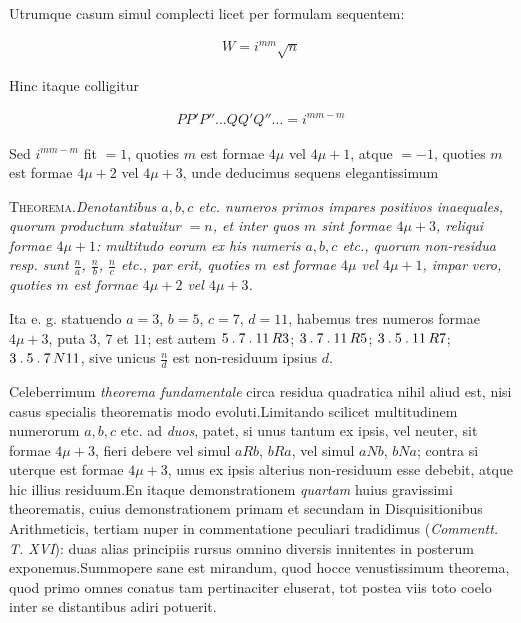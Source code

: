 Utrumque casum simul complecti licet per formulam sequentem:

\[
\begin{aligned}
W=i^{mm}\surd n
\end{aligned}
\]

Hinc itaque colligitur

\[
\begin{aligned}
PP'P''\ldots QQ'Q''\ldots=i^{mm-m}
\end{aligned}
\]

Sed $i^{mm-m}$ fit $=1$, quoties $m$ est formae $4\mu$ vel $4\mu+1$, atque $=-1$, quoties $m$ est formae $4\mu+2$ vel $4\mu+3$, unde deducimus sequens elegantissimum

\textsc{Theorema.}\quad \textit{Denotantibus $a,b,c$ etc. numeros primos impares positivos inae}\textit{quales, quorum productum statuitur $=n$, et inter quos $m$ sint formae $4\mu+3$, re}\textit{liqui formae $4\mu+1$: multitudo eorum ex his numeris $a,b,c$ etc., quorum non-resi}\textit{dua resp. sunt $\frac{n}{a}$, $\frac{n}{b}$, $\frac{n}{c}$ etc., par erit, quoties $m$ est formae $4\mu$ vel $4\mu+1$, impar} \textit{vero, quoties $m$ est formae $4\mu+2$ vel $4\mu+3$.}

Ita e. g. statuendo $a=3$, $b=5$, $c=7$, $d=11$, habemus tres numeros formae $4\mu+3$, puta $3$, $7$ et $11$; est autem $5\mathbin{.}7\mathbin{.}11\,R3$; $3\mathbin{.}7\mathbin{.}11\,R5$; $3\mathbin{.}5\mathbin{.}11\,R7$; $3\mathbin{.}5\mathbin{.}7\,N11$, sive unicus $\frac{n}{d}$ est non-residuum ipsius $d$.


Celeberrimum \textit{theorema fundamentale} circa residua quadratica nihil aliud est, nisi casus specialis theorematis modo evoluti.\quad Limitando scilicet multitudinem
%
numerorum $a,b,c$ etc. ad \textit{duos}, patet, si unus tantum ex ipsis, vel neuter, sit formae $4\mu+3$, fieri debere vel simul $aRb$, $bRa$, vel simul $aNb$, $bNa$; contra si uterque est formae $4\mu+3$, unus ex ipsis alterius non-residuum esse debebit, atque hic illius residuum.\quad En itaque demonstrationem \textit{quartam} huius gravissimi theorematis, cuius demonstrationem primam et secundam in Disquisitionibus Arithmeticis, tertiam nuper in commentatione peculiari tradidimus (\textit{Commentt. T. XVI}): duas alias principiis rursus omnino diversis innitentes in posterum exponemus.\quad Summopere sane est mirandum, quod hocce venustissimum theorema, quod primo omnes conatus tam pertinaciter eluserat, tot postea viis toto coelo inter se distantibus adiri potuerit.

